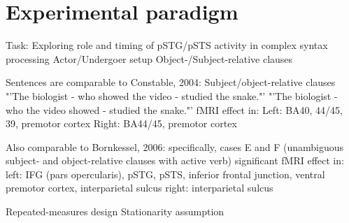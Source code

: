 \section{Experimental paradigm}

Task: Exploring role and timing of pSTG/pSTS activity in complex syntax processing
Actor/Undergoer setup
Object-/Subject-relative clauses

Sentences are comparable to Constable, 2004:
Subject/object-relative clauses
"'The biologist - who showed the video - studied the snake."'
"'The biologist - who the video showed - studied the snake."'
fMRI effect in:
Left: BA40, 44/45, 39, premotor cortex
Right: BA44/45, premotor cortex

Also comparable to Bornkessel, 2006:
specifically, cases E and F (unambiguous subject- and object-relative clauses with active verb)
significant fMRI effect in:
left: IFG (pars opercularis), pSTG, pSTS, inferior frontal junction, ventral premotor cortex, interparietal sulcus
right: interparietal sulcus

Repeated-measures design
Stationarity assumption

